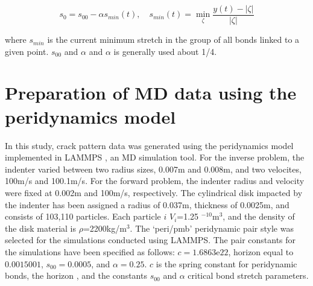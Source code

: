  \begin{equation}
s_0=s_{00}-\alpha s_{min}(t), \quad s_{min}(t)=\min_\zeta{\frac{y(t)-|\zeta|}{|\zeta|}}
\end{equation}

 \noindent where $s_{min}$ is the current minimum stretch in the group of all bonds linked to a given point.
 $s_{00}$ and $\alpha$ {} and $\alpha$ is generally used about 1/4. 

\section{Preparation of MD data using the peridynamics model }
\label{sec:3}

In this study, crack pattern data was generated using the peridynamics model implemented in LAMMPS \cite{Ref16}, an MD simulation tool.
{}
For the inverse problem, the indenter varied between two radius sizes, 0.007m and 0.008m, and two velocites, 100m/s and 100.1m/s.
For the forward problem, the indenter radius and velocity were fixed at 0.002m and 100m/s, respectively.
The cylindrical disk impacted by the indenter has been assigned a radius of 0.037m, thickness of 0.0025m, and consists of 103,110 particles.
Each particle $i$ {} $V_i$=1.25 $^{-10}$m$^3$, and the density of the disk material is $\rho$=2200kg/m$^3$.
The `peri/pmb' peridynamic pair style was selected for the simulations conducted using LAMMPS.
The pair constants for the simulations have been specified as follows: $c=1.6863\mathrm{e}22$, horizon equal to $0.0015001$, $s_{00}= 0.0005$, and $\alpha = 0.25$.
$c$ is the spring constant for peridynamic bonds, the horizon {},
and the constants $s_{00}$ and $\alpha$ {} critical bond stretch parameters.
